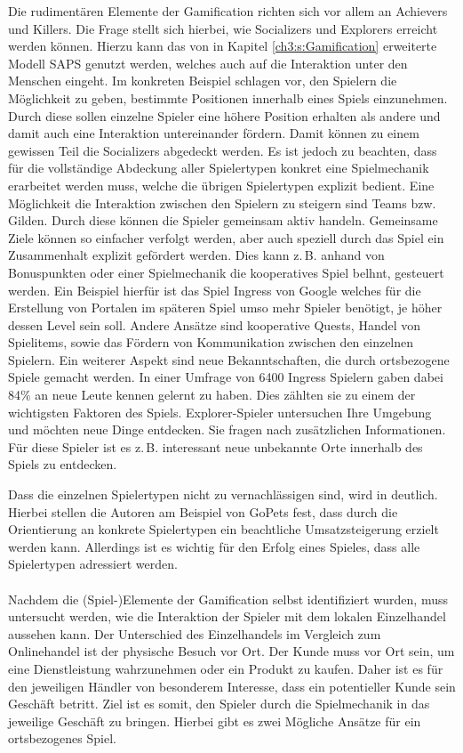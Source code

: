 Die rudimentären Elemente der Gamification richten sich vor allem an Achievers und Killers.
Die Frage stellt sich hierbei, wie Socializers und Explorers erreicht werden können.
Hierzu kann das von \textcite{Zichermann.2011} in Kapitel \ref{ch3:s:Gamification} erweiterte Modell SAPS genutzt werden, welches auch auf die Interaktion unter den Menschen eingeht. Im konkreten Beispiel schlagen \textcite{Zichermann.2011} vor, den Spielern die Möglichkeit zu geben, bestimmte Positionen innerhalb eines Spiels einzunehmen. Durch diese sollen einzelne Spieler eine höhere Position erhalten als andere und damit auch eine Interaktion untereinander fördern. Damit können zu einem gewissen Teil die Socializers abgedeckt werden.
Es ist jedoch zu beachten, dass für die vollständige Abdeckung aller Spielertypen konkret eine Spielmechanik erarbeitet werden muss, welche die übrigen Spielertypen explizit bedient. Eine Möglichkeit die Interaktion zwischen den Spielern zu steigern sind Teams bzw. Gilden. Durch diese können die Spieler gemeinsam aktiv handeln. Gemeinsame Ziele können so einfacher verfolgt werden, aber auch speziell durch das Spiel ein Zusammenhalt explizit gefördert werden. Dies kann z.\,B. anhand von Bonuspunkten oder einer Spielmechanik die kooperatives Spiel belhnt, gesteuert werden. Ein Beispiel hierfür ist das Spiel Ingress von Google welches für die Erstellung von Portalen im späteren Spiel umso mehr Spieler benötigt, je höher dessen Level sein soll.\cite{Celino.2013}
Andere Ansätze sind kooperative Quests, Handel von Spielitems, sowie das Fördern von Kommunikation zwischen den einzelnen Spielern.\cite{Caon.2013}
Ein weiterer Aspekt sind neue Bekanntschaften, die durch ortsbezogene Spiele gemacht werden. In einer Umfrage von 6400 Ingress Spielern gaben dabei 84\% an neue Leute kennen gelernt zu haben. Dies zählten sie zu einem der wichtigsten Faktoren des Spiels.\cite{Ingress.2014}
Explorer-Spieler untersuchen Ihre Umgebung und möchten neue Dinge entdecken. Sie fragen nach zusätzlichen Informationen. Für diese Spieler ist es z.\,B. interessant neue unbekannte Orte innerhalb des Spiels zu entdecken.

Dass die einzelnen Spielertypen nicht zu vernachlässigen sind, wird in \textcite{Bromley.2013} deutlich. Hierbei stellen die Autoren am Beispiel von GoPets fest, dass durch die Orientierung an konkrete Spielertypen ein beachtliche Umsatzsteigerung erzielt werden kann. Allerdings ist es wichtig für den Erfolg eines Spieles, dass alle Spielertypen adressiert werden.\cite{Bethke.2007}
\\\\
Nachdem die (Spiel-)Elemente der Gamification selbst identifiziert wurden, muss untersucht werden, wie die Interaktion der Spieler mit dem lokalen Einzelhandel aussehen kann.
Der Unterschied des Einzelhandels im Vergleich zum Onlinehandel ist der physische Besuch vor Ort. Der Kunde muss vor Ort sein, um eine Dienstleistung wahrzunehmen oder ein Produkt zu kaufen. Daher ist es für den jeweiligen Händler von besonderem Interesse, dass ein potentieller Kunde sein Geschäft betritt.
Ziel ist es somit, den Spieler durch die Spielmechanik in das jeweilige Geschäft zu bringen.
Hierbei gibt es zwei Mögliche Ansätze für ein ortsbezogenes Spiel.

